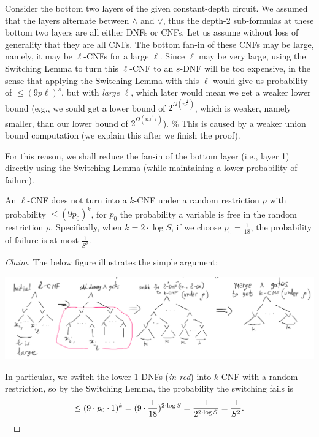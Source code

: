 Consider the bottom two layers of the given constant-depth circuit. We assumed that the layers alternate between $\land$ and $\lor$, thus the depth-2 sub-formulas  at these bottom two layers are all either DNFs or CNFs. Let us assume  without loss of generality  that they are all CNFs. The bottom fan-in of these CNFs may be large, namely, it may be $\ell$-CNFs for a large $\ell$. 
Since  $\ell$ may be  very large, using the Switching Lemma to turn this $\ell$-CNF to an $s$-DNF will be too expensive, in the sense that applying the Switching Lemma with this $\ell$ would give us probability of $\leq (9p\ell)^s$, but with \emph{large} $\ell$, which later would mean we get a weaker lower bound (e.g., we sould get a lower bound of $2^{\Omega(n^{\frac{1}{d}})}$, which is weaker, namely smaller, than our lower bound of $2^{\Omega(n^{\frac{1}{d-1}})}$).
\textcolor[rgb]{0.815686,0.815686,0.815686}{\% This is caused by a weaker union bound computation (we explain this after we finish the proof).}



For this reason, we shall reduce the fan-in of the bottom layer (i.e., layer 1) directly using the Switching Lemma (while maintaining a lower probability of failure).

\begin{claim}\label{cla:}
An $\ell$-CNF does not turn into a $k$-CNF under a random restriction $\rho$ with probability $\leq (9p_0)^k$, for $p_0$ the probability a variable is free in the random restriction $\rho$. Specifically, when $k = 2 \cdot \log S$, if we choose $p_0 = \frac{1}{18}$, the probability of failure is at most $ \frac{1}{S^2}$.
\end{claim}

\begin{proof}[Claim]
The below figure illustrates  the simple argument:

\begin{center}
\includegraphics[width=\textwidth]{images/bottom-layer-switch.png}
\end{center}


In particular, we switch the lower 1-DNFs (\emph{in red}) into $k$-CNF with a random restriction, so by the Switching Lemma, the probability the switching fails is 
\[
\leq (9 \cdot p_0 \cdot1)^k = (9 \cdot \frac{1}{18})^{2 \cdot \log S} = \frac{1}{2^{2 \cdot\log S}} = \frac{1}{S^2}.
\]
\
\end{proof}

